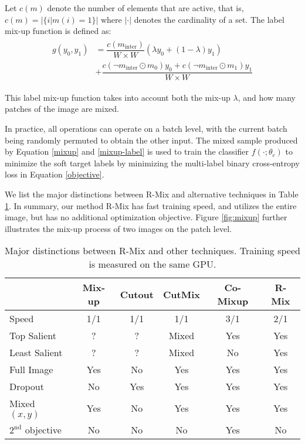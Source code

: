 \documentclass[letterpaper]{article} \usepackage[submission]{aaai23}  \usepackage{times}  \usepackage{helvet}  \usepackage{courier}  \usepackage[hyphens]{url}  \usepackage{graphicx} \urlstyle{rm} \def\UrlFont{\rm}  \usepackage{natbib}  \usepackage{caption} \frenchspacing  \setlength{\pdfpagewidth}{8.5in} \setlength{\pdfpageheight}{11in}
\newcommand{\rrlmix}{{R-Mix}}
\begin{document}
Let $c(m)$ denote the number of elements that are active, that is, $c(m) = |\{i|m(i) = 1\}|$ where $|\cdot|$ denotes the cardinality of a set. The label mix-up function is defined as:
\begin{align}
\label{mixup-label}
\begin{split}
    g(y_0, y_1) & =  \dfrac{c(m_{\text{inter}})}{W \times W}(\lambda y_0 + (1-\lambda) y_1) \\
    & + \dfrac{c(\neg m_{\text{inter}} \odot m_0)y_0 + 
    c(\neg m_{\text{inter}} \odot m_1)y_1}{W \times W}
\end{split}
\end{align}

This label mix-up function takes into account both the mix-up $\lambda$, and how many patches of the image are mixed. 


In practice, all operations can operate on a batch level, with the current batch being randomly permuted to obtain the other input. The mixed sample produced by Equation \ref{mixup} and \ref{mixup-label} is used to train the classifier $f(\cdot;\theta_c)$ to minimize the soft target labels by minimizing the multi-label binary cross-entropy loss in Equation \ref{objective}.


We list the major distinctions between \rrlmix{} and alternative techniques in Table \ref{tab:differences}. In summary, our method \rrlmix{} has fast training speed, and utilizes the entire image, but has no additional optimization objective. Figure \ref{fig:mixup} further illustrates the mix-up process of two images on the patch level.

\begin{table}[t!]
\centering
\begin{adjustbox}{width=1\columnwidth}
\begin{tabular}{lcccc|c}
\hline
 & {Mix-up} & Cutout & CutMix & Co-Mixup & R-Mix \\ \hline
Speed & 1/1 & 1/1 & 1/1 & 3/1 & 2/1 \\
Top Salient & ? & ? & Mixed & Yes & Yes \\ 
Least Salient & ? & ? & Mixed & No & Yes \\ 
Full Image & Yes & No & Yes & Yes & Yes \\ 
Dropout & No & Yes & Yes & Yes & Yes \\
Mixed $(x,y)$ & Yes & No & Yes & Yes & Yes \\ 
$2^{\text{nd}}$ objective & No & No & No & Yes & No \\
\hline

\end{tabular}
\end{adjustbox}


\caption{Major distinctions between \rrlmix{} and other techniques. Training speed is measured on the same GPU.}
\label{tab:differences}
\end{table} 
\end{document}
